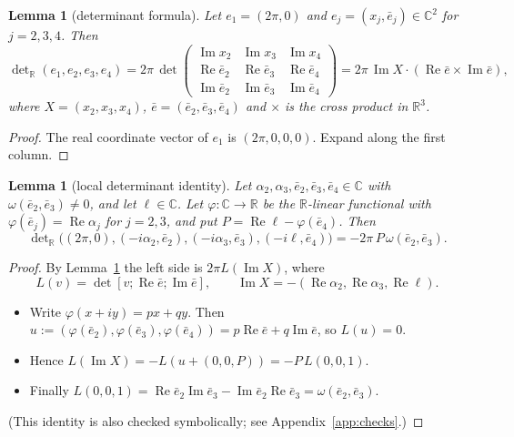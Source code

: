 \documentclass{article}
\newtheorem{lemma}[theorem]{Lemma}
\theoremstyle{definition}
\theoremstyle{plain}
\newcommand{\R}{\mathbb{R}}
\newcommand{\C}{\mathbb{C}}
\newcommand{\eb}{\bar e}
\DeclareMathOperator{\Ima}{Im}
\DeclareMathOperator{\Rea}{Re}
\begin{document}
\begin{lemma}[determinant formula]\label{lem:det}
Let $e_1=(2\pi,0)$ and $e_j=(x_j,\eb_j)\in\C^2$ for $j=2,3,4$. Then
\[
\det\nolimits_\R(e_1,e_2,e_3,e_4)=2\pi\,\det\begin{pmatrix}\Ima x_2&\Ima x_3&\Ima x_4\\
\Rea\eb_2&\Rea\eb_3&\Rea\eb_4\\ \Ima\eb_2&\Ima\eb_3&\Ima\eb_4\end{pmatrix}
=2\pi\,\Ima X\cdot(\Rea\eb\times\Ima\eb),
\]
where $X=(x_2,x_3,x_4)$, $\eb=(\eb_2,\eb_3,\eb_4)$ and $\times$ is the cross product
in $\R^3$.
\end{lemma}
\begin{proof}
The real coordinate vector of $e_1$ is $(2\pi,0,0,0)$. Expand along the first column.
\end{proof}

\begin{lemma}[local determinant identity]\label{lem:localdet}
Let $\alpha_2,\alpha_3,\eb_2,\eb_3,\eb_4\in\C$ with $\omega(\eb_2,\eb_3)\ne0$,
and let $\ell\in\C$. Let $\varphi\colon\C\to\R$ be the $\R$-linear functional with
$\varphi(\eb_j)=\Rea\alpha_j$ for $j=2,3$, and put $P=\Rea\ell-\varphi(\eb_4)$. Then
\[
\det\nolimits_\R\big((2\pi,0),(-i\alpha_2,\eb_2),(-i\alpha_3,\eb_3),(-i\ell,\eb_4)\big)=
-2\pi\,P\,\omega(\eb_2,\eb_3).
\]
\end{lemma}
\begin{proof}
By Lemma~\ref{lem:det} the left side is $2\pi L(\Ima X)$, where
\[L(v)=\det[v;\Rea\eb;\Ima\eb],\qquad \Ima X=-(\Rea\alpha_2,\Rea\alpha_3,\Rea\ell).\]
\begin{itemize}
\item Write $\varphi(x+iy)=px+qy$. Then
  $u:=(\varphi(\eb_2),\varphi(\eb_3),\varphi(\eb_4))=p\Rea\eb+q\Ima\eb$, so $L(u)=0$.
\item Hence $L(\Ima X)=-L(u+(0,0,P))=-P\,L(0,0,1)$.
\item Finally $L(0,0,1)=\Rea\eb_2\Ima\eb_3-\Ima\eb_2\Rea\eb_3=\omega(\eb_2,\eb_3)$.
\end{itemize}
(This identity is also checked symbolically; see Appendix~\ref{app:checks}.)
\end{proof}
\end{document}
